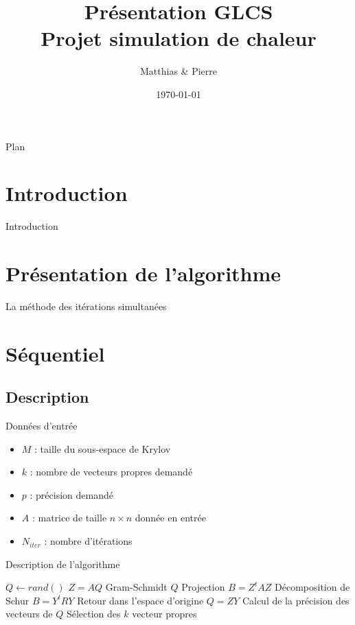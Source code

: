 \documentclass[9.5pt]{beamer}
\title[GLCS : Projet simulation de chaleur]{Présentation GLCS \\Projet simulation de chaleur}
\author[\bsc{Beaupère} \& \bsc{Granger}]{Matthias \bsc{Beaupère} \& Pierre \bsc{Granger}}
\institute{M2 CHPS}
\date{\today}
\begin{document}

\begin{frame}
  \titlepage
\end{frame}

\begin{frame}{Plan}
	\tableofcontents[hideallsubsections]
\end{frame}

\section{Introduction}
	\begin{frame}{Introduction}

	\end{frame}

\section{Présentation de l'algorithme}
	\begin{frame}{La méthode des itérations simultanées}

	\end{frame}

\section{Séquentiel}
	\subsection{Description}
		\begin{frame}{Données d'entrée}
			\begin{itemize}
				\item $M$ : taille du sous-espace de Krylov
				\item $k$ : nombre de vecteurs propres demandé
				\item $p$ : précision demandé
				\item $A$ : matrice de taille $n\times n$ donnée en entrée
				\item $N_{iter}$ : nombre d'itérations
			\end{itemize}
		\end{frame}
		\begin{frame}{Description de l'algorithme}
			\begin{algorithmic}
				\State $Q \gets rand()$
					\State $Z = AQ$
					\State Gram-Schmidt $Q$
					\State Projection $B = Z^tAZ$
					\State Décomposition de Schur $B = Y^tRY$
					\State Retour dans l'espace d'origine $Q = ZY$
					\State Calcul de la précision des vecteurs de $Q$
					\State Sélection des $k$ vecteur propres
				\EndWhile
			\end{algorithmic}
		\end{frame}
\end{document}
